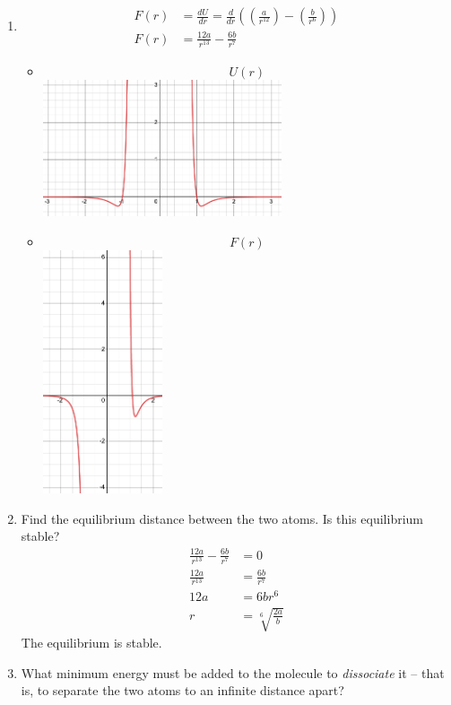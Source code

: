 \documentclass{article}
\begin{document}
\begin{enumerate}[label = \textbf{(\alph*)}]
	\item
		\begin{align*}
			F(r) & = \frac{dU}{dr} = \frac{d}{dr} \left( \left( \frac{a}{r^{12}} \right) - \left( \frac{b}{r^6} \right) \right) \\
			F(r) & = \frac{12a}{r^{13}} - \frac{6b}{r^7}
		\end{align*}
		\begin{itemize}
			\item $$ U(r) $$
				\includegraphics[width = 200pt]{graph_1.png}
			\item $$ F(r) $$
				\includegraphics[width = 100pt]{graph_2.png}
		\end{itemize}
	\item Find the equilibrium distance between the two atoms. Is this equilibrium stable?
		\begin{align*}
			\frac{12a}{r^{13}} - \frac{6b}{r^7} & = 0 \\
			\frac{12a}{r^{13}} & = \frac{6b}{r^7} \\
			12a & = 6br^6 \\
			r & = \sqrt[6]{ \frac{2a}{b} }
		\end{align*}
		The equilibrium is stable.
	\item What minimum energy must be added to the molecule to \textit{dissociate} it – that is, to separate the two atoms to an infinite distance apart? \\

\end{enumerate}
\end{document}
